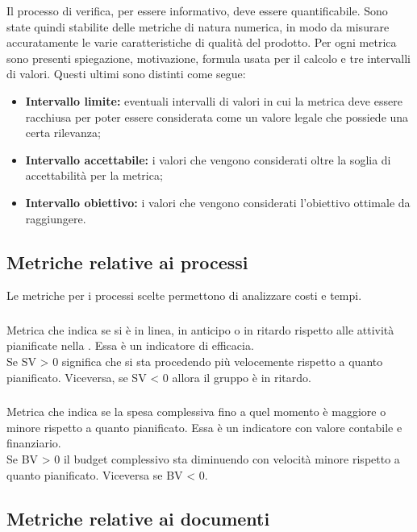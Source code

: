 Il processo di verifica, per essere informativo, deve essere quantificabile. Sono state quindi stabilite delle metriche di natura numerica, in modo da misurare accuratamente le varie caratteristiche di qualità del prodotto. Per ogni metrica sono presenti  spiegazione, motivazione, formula usata per il calcolo e tre intervalli di valori. Questi ultimi sono distinti come segue:
\begin{itemize}
	\item {\textbf{Intervallo limite:} eventuali intervalli di valori in cui la metrica deve essere racchiusa per poter essere considerata come un valore legale che possiede una certa rilevanza;}
	\item {\textbf{Intervallo accettabile:} i valori che vengono considerati oltre la soglia di accettabilità per la metrica;}
	\item {\textbf{Intervallo obiettivo:} i valori che vengono considerati l'obiettivo ottimale da raggiungere.}
\end{itemize}

\subsection{Metriche relative ai processi}
Le metriche per i processi scelte permettono di analizzare costi e tempi.
\subsubsection{}
Metrica che indica se si è in linea, in anticipo o in ritardo rispetto alle attività pianificate nella . Essa è un indicatore di efficacia. \\
Se SV > 0 significa che si sta procedendo più velocemente rispetto a quanto pianificato. Viceversa, se SV < 0 allora il gruppo è in ritardo. 
\subsubsection{}
Metrica che indica se la spesa complessiva fino a quel momento è maggiore o minore rispetto a quanto pianificato. Essa è un indicatore con valore contabile e finanziario. \\
Se BV > 0 il budget complessivo sta diminuendo con velocità minore rispetto a quanto pianificato. Viceversa se BV < 0.

\subsection{Metriche relative ai documenti}
